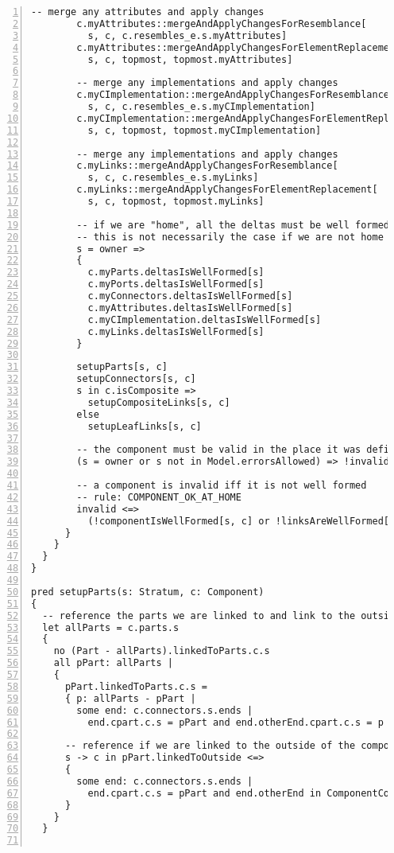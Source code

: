 \begin{lstlisting}[caption={bb.als}, numbers=left]
        -- merge any attributes and apply changes
        c.myAttributes::mergeAndApplyChangesForResemblance[
          s, c, c.resembles_e.s.myAttributes]
        c.myAttributes::mergeAndApplyChangesForElementReplacement[
          s, c, topmost, topmost.myAttributes]
          
        -- merge any implementations and apply changes
        c.myCImplementation::mergeAndApplyChangesForResemblance[
          s, c, c.resembles_e.s.myCImplementation]
        c.myCImplementation::mergeAndApplyChangesForElementReplacement[
          s, c, topmost, topmost.myCImplementation]
          
        -- merge any implementations and apply changes
        c.myLinks::mergeAndApplyChangesForResemblance[
          s, c, c.resembles_e.s.myLinks]
        c.myLinks::mergeAndApplyChangesForElementReplacement[
          s, c, topmost, topmost.myLinks]
          
        -- if we are "home", all the deltas must be well formed...
        -- this is not necessarily the case if we are not home
        s = owner =>
        {
          c.myParts.deltasIsWellFormed[s]
          c.myPorts.deltasIsWellFormed[s]
          c.myConnectors.deltasIsWellFormed[s]
          c.myAttributes.deltasIsWellFormed[s]
          c.myCImplementation.deltasIsWellFormed[s]
          c.myLinks.deltasIsWellFormed[s]
        }
        
        setupParts[s, c]
        setupConnectors[s, c]
        s in c.isComposite =>
          setupCompositeLinks[s, c]
        else
          setupLeafLinks[s, c]
        
        -- the component must be valid in the place it was defined
        (s = owner or s not in Model.errorsAllowed) => !invalid
        
        -- a component is invalid iff it is not well formed
        -- rule: COMPONENT_OK_AT_HOME
        invalid <=>
          (!componentIsWellFormed[s, c] or !linksAreWellFormed[s, c])
      }
    }
  }
}

pred setupParts(s: Stratum, c: Component)
{
  -- reference the parts we are linked to and link to the outside if true
  let allParts = c.parts.s
  {
    no (Part - allParts).linkedToParts.c.s
    all pPart: allParts |
    {
      pPart.linkedToParts.c.s =
      { p: allParts - pPart |
        some end: c.connectors.s.ends |
          end.cpart.c.s = pPart and end.otherEnd.cpart.c.s = p }
        
      -- reference if we are linked to the outside of the component
      s -> c in pPart.linkedToOutside <=>
      {
        some end: c.connectors.s.ends |
          end.cpart.c.s = pPart and end.otherEnd in ComponentConnectorEnd
      }
    }
  }


\end{lstlisting}
